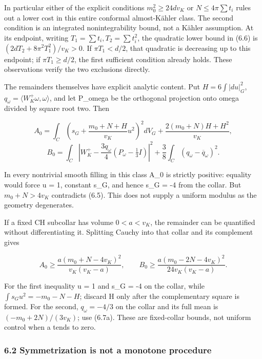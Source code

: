 \documentclass[
  10pt,
]{article}
\begin{document}
In particular either of the explicit conditions \(m_0^2\ge24dv_K\) or
\(N\le4\pi\sum t_i\) rules out a lower cost in this entire conformal
almost-Kähler class. The second condition is an integrated
nonintegrability bound, not a Kähler assumption. At its endpoint,
writing \(T_1=\sum t_i,T_2=\sum t_i^2\), the quadratic lower bound in
(6.6) is \((2dT_2+8\pi^2T_1^2)/v_K>0\). If \(\pi T_1<d/2\), that
quadratic is decreasing up to this endpoint; if \(\pi T_1\ge d/2\), the
first sufficient condition already holds. These observations verify the
two exclusions directly.

The remainders themselves have explicit analytic content. Put
\(H=6\int|du|_G^2\), \(q_\omega=\langle W_K^+\omega,\omega\rangle\), and
let P\_omega be the orthogonal projection onto omega divided by square
root two. Then

\[
 A_0=\int_C\left(s_G+\frac{m_0+N+H}{v_K}u^2\right)^2dV_G
                  +\frac{2(m_0+N)H+H^2}{v_K},
\] \[
 B_0=\int_C\left|W_K^+-\frac{3q_\omega}{4}
                  (P_\omega-\tfrac13I)\right|^2
             +\frac38\int_C(q_\omega-\overline q_\omega)^2.
                                                               \tag{6.7a}
\]

In every nontrivial smooth filling in this class A\_0 is strictly
positive: equality would force u = 1, constant s\_G, and hence s\_G = -4
from the collar. But \(m_0+N>4v_K\) contradicts (6.5). This does not
supply a uniform modulus as the geometry degenerates.

If a fixed CH subcollar has volume \(0<a<v_K\), the remainder can be
quantified without differentiating it. Splitting Cauchy into that collar
and its complement gives

\[
 A_0\ge\frac{a(m_0+N-4v_K)^2}{v_K(v_K-a)},\qquad
 B_0\ge\frac{a(m_0-2N-4v_K)^2}{24v_K(v_K-a)}.             \tag{6.7b}
\]

For the first inequality u = 1 and s\_G = -4 on the collar, while
\(\int s_Gu^2=-m_0-N-H\); discard H only after the complementary square
is formed. For the second, \(q_\omega=-4/3\) on the collar and its full
mean is \((-m_0+2N)/(3v_K)\); use (6.7a). These are fixed-collar bounds,
not uniform control when a tends to zero.

\hypertarget{symmetrization-is-not-a-monotone-procedure}{%
\subsubsection{6.2 Symmetrization is not a monotone
procedure}\label{symmetrization-is-not-a-monotone-procedure}}
\end{document}
